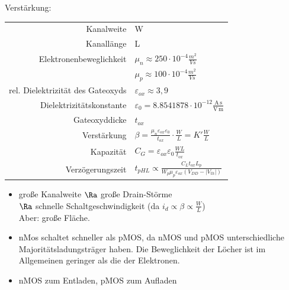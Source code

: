 \documentclass[english]{latex4ei/latex4ei_sheet}
\begin{document}
Verstärkung:  \\
\begin{tabular} {r | l}
	Kanalweite & W  \\
	Kanallänge & L  \\
	Elektronenbeweglichkeit & $\mu_n \approx 250 \cdot 10^{-4} \frac{m^2}{Vs}$\\
	 & $\mu_p \approx 100 \cdot 10^{-4} \frac{m^2}{Vs}$ \\
	rel. Dielektrizität des Gateoxyds & $\varepsilon_{ox} \approx 3,9$ \\
	Dielektrizitätskonstante & $\varepsilon_0 = 8.8541878 \cdot 10^{-12} \frac{\mathrm{A\,s}}{\mathrm{V\,m}}$ \\
	Gateoxyddicke & $t_{ox}$ \\
	Verstärkung & $\beta = \frac{\mu_n \varepsilon_{ox} \varepsilon_0}{t_{ox}} \cdot \frac{W}{L} = K' \frac{W}{L}$ \\
	Kapazität & $C_G = \varepsilon_{ox} \varepsilon_0 \frac{WL}{t_{ox}}$ \\
	Verzögerungszeit & $t_{pHL} \propto \frac{C_L t_{ox} L_p}{W_p \mu_p \varepsilon_{ox} (V_{DD} - |V_{th}|)}$ \\
\end{tabular}
\begin{itemize}
	\item große Kanalweite $\Ra$ große Drain-Störme \\ $\Ra$ schnelle Schaltgeschwindigkeit (da $i_d \propto \beta \propto \frac{W}{L}$) \\
	Aber: große Fläche.
	\item nMos schaltet schneller als pMOS, da nMOS und pMOS unterschiedliche Majoritätsladungsträger haben. Die Beweglichkeit der Löcher ist im Allgemeinen geringer als die der Elektronen. 
	\item nMOS zum Entladen, pMOS zum Aufladen
\end{itemize}
\end{document}
